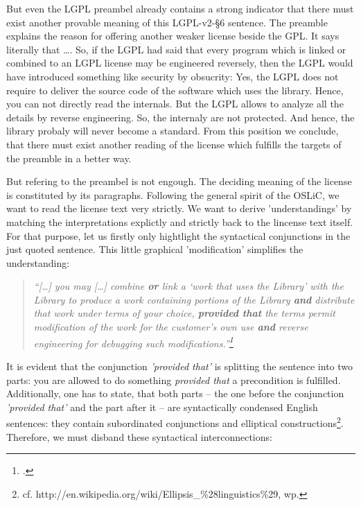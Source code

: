 But even the LGPL preambel already contains a strong indicator that there must
exist another provable meaning of this LGPL-v2-§6 sentence. The preamble
explains the reason for offering another weaker license beside the GPL. It says
literally that \ldots. So, if the LGPL had said that every program which is
linked or combined to an LGPL license may be engineered reversely, then the LGPL
would have introduced something like security by obsucrity: Yes, the LGPL does
not require to deliver the source code of the software which uses
the library. Hence, you can not directly read the internals. But the LGPL allows
to analyze all the details by reverse engineering. So, the internaly are not
protected. And hence, the library probaly will never become a standard. From
this position we conclude, that there must exist another reading of the license
which fulfills the targets of the preamble in a better way.

But refering to the preambel is not engough. The deciding meaning of the license
is constituted by its paragraphs. Following the general spirit of the OSLiC, we
want to read the license text very strictly. We want to derive 'understandings'
by matching the interpretations explictly and strictly back to the lincense text
itself. For that purpose, let us firstly only hightlight the syntactical
conjunctions in the just quoted sentence. This little graphical 'modification'
simplifies the understanding:

\begin{quote}\noindent\emph{\enquote{[\ldots] you may [\ldots] combine
\textbf{or} link a \enquote{work that uses the Library} with the Library to
produce a work containing portions of the Library \textbf{and} distribute that
work under terms of your choice, \textbf{provided that} the terms permit
modification of the work for the customer's own use \textbf{and} \emph{reverse
engineering} for debugging such modifications.}\footcite[cf.][\nopage wp. herv.
KR.]{Lgpl21OsiLicense1999a}}
\end{quote}

It is evident that the conjunction \emph{'provided that'} is splitting the
sentence into two parts: you are allowed to do something \emph{provided that} a
precondition is fulfilled. Additionally, one has to state, that both parts --
the one before the conjunction \emph{'provided that'} and the part after it --
are syntactically condensed English sentences: they contain subordinated 
conjunctions and elliptical constructions\footnote{cf.
http://en.wikipedia.org/wiki/Ellipsis\_\%28linguistics\%29, wp.
}. Therefore, we must disband these syntactical interconnections:

